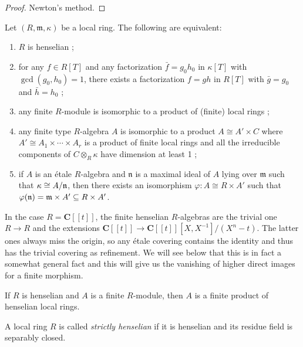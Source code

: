 \begin{proof}
Newton's method.
\end{proof}

\begin{theorem}
\label{theorem-heselian}
Let $(R, \mathfrak m, \kappa)$ be a local ring. The following are equivalent:
\begin{enumerate}
\item $R$ is henselian ;
\item for any $f\in R[T]$ and any factorization $\bar f = g_0 h_0$ in
$\kappa[T]$ with $\gcd(g_0,h_0)=1$, there exists a factorization $f=gh$ in
$R[T]$ with $\bar g = g_0$ and $\bar h=h_0$ ;
\item any finite $R$-module is isomorphic to a product of (finite) local rings ;
\item any finite type $R$-algebra $A$ is isomorphic to a product $A \cong A'
\times C$ where $A' \cong A_1 \times \cdots \times A_r$ is a product of finite
local rings and all the irreducible components of $C\otimes_R\kappa$ have
dimension at least 1 ;
\item if $A$ is an \'etale $R$-algebra and $\mathfrak n$ is a maximal ideal of
$A$ lying over $\mathfrak m$ such that $\kappa \cong A/\frak n$, then there
exists an isomorphism $\varphi: A \cong R\times A'$ such that $\varphi(\frak n)
= \frak m \times A'\subseteq R\times A'$.
\end{enumerate}
\end{theorem}

\begin{example}
\label{example-powerseries}
In the case $R = \mathbf{C}[[t]]$, the finite henselian $R$-algebras are the
trivial one $R \to R$ and the extensions
$\mathbf{C}[[t]] \to \mathbf{C}[[t]][X, X^{-1}]/(X^n-t)$.
The latter ones always miss the origin, so any
\'etale covering contains the identity and thus has the trivial covering as
refinement. We will see below that this is in fact a somewhat general fact and
this will give us the vanishing of higher direct images for a finite morphism.
\end{example}

\begin{lemma}
\label{lemma-finite-over-henselian}
If $R$ is henselian and $A$ is a finite $R$-module, then $A$ is a finite
product of henselian local rings.
\end{lemma}

\begin{definition}
\label{definition-strictly-henselian}
A local ring $R$ is called {\it strictly henselian} if it is henselian and its
residue field is separably closed.
\end{definition}

